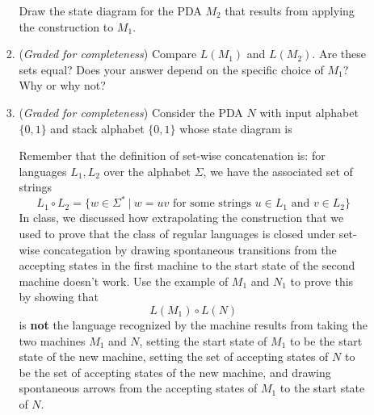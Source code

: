 \documentclass[12pt, oneside]{article}
\newcommand{\gradeComplete}{({\it Graded for completeness}) }
\begin{document}
\begin{enumerate}[wide, labelwidth=!, labelindent=0pt]
\begin{enumerate}
\begin{enumerate}
\begin{center}
\end{center}

Draw the state diagram for the PDA $M_2$ that results from applying 
the construction to $M_1$.

\item\gradeComplete Compare $L(M_1)$ and $L(M_2)$. Are these sets 
equal? Does your answer depend on the specific choice of $M_1$? Why or why not?

\item\gradeComplete Consider the PDA $N$ with input alphabet $\{0,1\}$ and
stack alphabet $\{0,1\}$ whose state diagram is 

\begin{center}

\end{center}

   Remember that the definition of set-wise concatenation is:
    for languages $L_1, L_2$ over the alphabet $\Sigma$, we have the 
    associated set of strings
    \[
       L_1 \circ L_2 = \{ w \in \Sigma^* ~|~ w = uv \text{ for some strings } u \in L_1 \text{ and } v \in L_2 \}
    \]
    In class, we discussed how extrapolating the construction that we used to prove that the class of regular languages
    is closed under set-wise concategation by drawing 
    spontaneous transitions from the accepting states in the first 
    machine to the start state of the second machine doesn't work.
    Use the example of $M_1$ and $N_1$ to prove this by showing that
    \[
    L(M_1) \circ L(N)
    \]
    is {\bf not} the language recognized by the machine 
    results from taking the two machines
    $M_1$ and $N$, setting the start state of $M_1$ to be the start state of 
    the new machine, setting the set of accepting states of $N$ to be
    the set of accepting states of the new machine, and drawing spontaneous 
    arrows from the accepting states
    of $M_1$ to the start state of $N$.


\end{enumerate}
\end{enumerate}
\end{enumerate}
\end{document}

